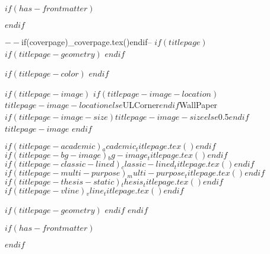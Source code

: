 $if(has-frontmatter)$
  \begin{frontmatter}
$endif$

\begin{titlepage}
$-- %
$if(coverpage)$
$_coverpage.tex()$
$endif$

$-- %
$if(titlepage)$
$if(titlepage-geometry)$
$endif$

$if(titlepage-color)$
\pagecolor{pgcolor}\afterpage{\nopagecolor}
$endif$

$if(titlepage-image)$
\This$if(titlepage-image-location)$$titlepage-image-location$$else$ULCorner$endif$WallPaper{$if(titlepage-image-size)$$titlepage-image-size$$else$0.5$endif$}{$titlepage-image$}
$endif$

$if(titlepage-academic)$$_academic_titlepage.tex()$$endif$
$if(titlepage-bg-image)$$_bg-image_titlepage.tex()$$endif$
$if(titlepage-classic-lined)$$_classic-lined_titlepage.tex()$$endif$
$if(titlepage-multi-purpose)$$_multi-purpose_titlepage.tex()$$endif$
$if(titlepage-thesis-static)$$_thesis_titlepage.tex()$$endif$
$if(titlepage-vline)$$_vline_titlepage.tex()$$endif$

$if(titlepage-geometry)$
\restoregeometry
$endif$
$endif$ %

\end{titlepage}
\setcounter{page}{1}
$if(has-frontmatter)$
\end{frontmatter}
$endif$
